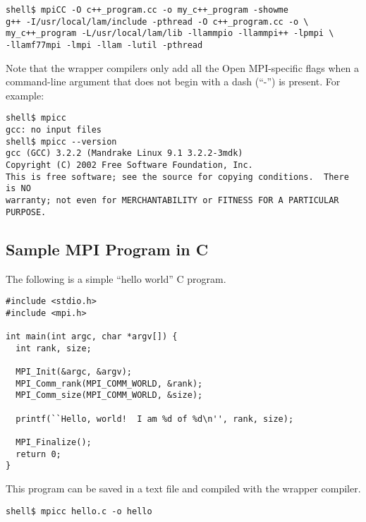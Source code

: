 \lstset{style=lam-cmdline}
\begin{lstlisting}
shell$ mpiCC -O c++_program.cc -o my_c++_program -showme
g++ -I/usr/local/lam/include -pthread -O c++_program.cc -o \
my_c++_program -L/usr/local/lam/lib -llammpio -llammpi++ -lpmpi \
-llamf77mpi -lmpi -llam -lutil -pthread
\end{lstlisting}


Note that the wrapper compilers only add all the Open MPI-specific
flags when a command-line argument that does not begin with a dash
(``-'') is present.  For example:

\lstset{style=lam-cmdline}
\begin{lstlisting}
shell$ mpicc
gcc: no input files
shell$ mpicc --version
gcc (GCC) 3.2.2 (Mandrake Linux 9.1 3.2.2-3mdk)
Copyright (C) 2002 Free Software Foundation, Inc.
This is free software; see the source for copying conditions.  There is NO
warranty; not even for MERCHANTABILITY or FITNESS FOR A PARTICULAR PURPOSE.
\end{lstlisting}



\subsection{Sample MPI Program in C}

The following is a simple ``hello world'' C program.

\lstset{style=lam-c}

\begin{lstlisting}
#include <stdio.h>
#include <mpi.h>

int main(int argc, char *argv[]) {
  int rank, size;

  MPI_Init(&argc, &argv);
  MPI_Comm_rank(MPI_COMM_WORLD, &rank);
  MPI_Comm_size(MPI_COMM_WORLD, &size);   

  printf(``Hello, world!  I am %d of %d\n'', rank, size);

  MPI_Finalize();
  return 0;
}
\end{lstlisting}

This program can be saved in a text file and compiled with the
 wrapper compiler.

\lstset{style=lam-cmdline}
\begin{lstlisting}
shell$ mpicc hello.c -o hello
\end{lstlisting}

